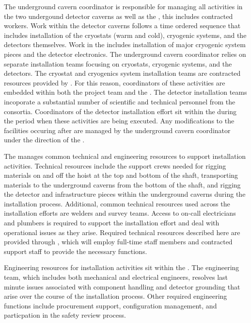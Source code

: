 The underground cavern coordinator is responsible for managing all 
activities in the two undergound detector caverns as well as the
, this includes contracted workers.  Work within the
detector caverns follows a time ordered sequence that includes
installation of the cryostats (warm and cold), cryogenic systems, and
the detectors themselves.  Work in the  includes
installation of major cryogenic system pieces and the detector
 electronics.  The underground cavern coordinator relies on
separate installation teams focusing on cryostats, cryogenic systems,
and the detectors.  The cryostat and cryogenics system installation
teams are contracted resources provided by .  For this
reason, coordinators of these activities are embedded within both the
 project team and the .  The detector
installation teams incoporate a substantial number of scientific and
technical personnel from the  consortia.  Coordinators of
the detector installation effort sit within the 
during the period when these activities are being executed.  Any
modifications to the facilities occuring after  are managed
by the underground cavern coordinator under the direction of the
.

The  manages common technical and engineering resources to
support installation activities.  Technical resources include the
support crews needed for rigging materials on and off the hoist at the
top and bottom of the shaft, transporting materials to the underground
caverns from the bottom of the shaft, and rigging the detector and
infrastructure pieces within the underground caverns during the
installation process.  Additional, common technical resources used
across the installation efforts are welders and survey teams. Access
to on-call electricians and plumbers is required to support the
installation effort and deal with operational issues as they arise.
Required technical resources described here are provided through 
, which will employ full-time staff members and contracted
support staff to provide the necessary functions.

Engineering resources for installation activities sit within
the .  The engineering team, which includes both mechanical
and electrical engineers, resolves last minute issues associated with
component handling and detector grounding that arise over the course
of the installation process.  Other required engineering functions
include procurement support, configuration management, and
particpation in the safety review process.

